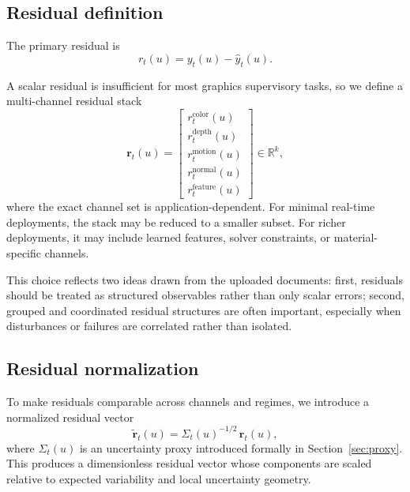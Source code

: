\documentclass[11pt,letterpaper]{article}
\theoremstyle{gcresult}
\theoremstyle{definition}
\begin{document}

\subsection{Residual definition}

The primary residual is
\begin{equation}
r_t(u)=y_t(u)-\hat y_t(u).
\end{equation}

A scalar residual is insufficient for most graphics supervisory tasks, so we define a multi-channel residual stack
\begin{equation}
\mathbf r_t(u)=
\begin{bmatrix}
r_t^{\mathrm{color}}(u)\\
r_t^{\mathrm{depth}}(u)\\
r_t^{\mathrm{motion}}(u)\\
r_t^{\mathrm{normal}}(u)\\
r_t^{\mathrm{feature}}(u)
\end{bmatrix}
\in \mathbb{R}^k,
\end{equation}
where the exact channel set is application-dependent. For minimal real-time deployments, the stack may be reduced to a smaller subset. For richer deployments, it may include learned features, solver constraints, or material-specific channels.

This choice reflects two ideas drawn from the uploaded documents: first, residuals should be treated as structured observables rather than only scalar errors; second, grouped and coordinated residual structures are often important, especially when disturbances or failures are correlated rather than isolated. 


\subsection{Residual normalization}

To make residuals comparable across channels and regimes, we introduce a normalized residual vector
\begin{equation}
\tilde{\mathbf r}_t(u)=\Sigma_t(u)^{-1/2}\,\mathbf r_t(u),
\end{equation}
where $\Sigma_t(u)$ is an uncertainty proxy introduced formally in Section~\ref{sec:proxy}. This produces a dimensionless residual vector whose components are scaled relative to expected variability and local uncertainty geometry.
\end{document}
